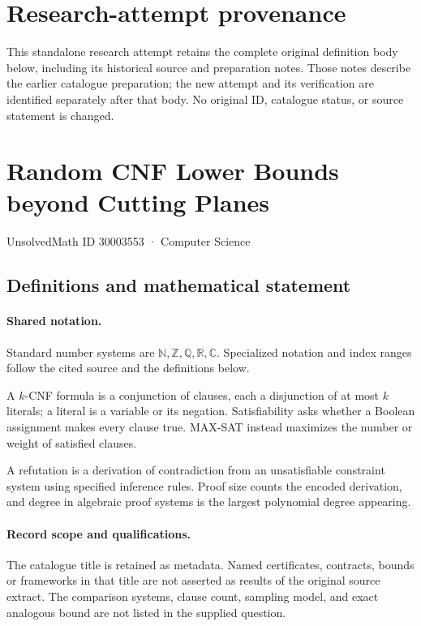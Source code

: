 \documentclass[11pt]{article}
\begin{document}
\section*{Research-attempt provenance}
This standalone research attempt retains the complete original definition body below,
including its historical source and preparation notes. Those notes describe the
earlier catalogue preparation; the new attempt and its verification are identified
separately after that body. No original ID, catalogue status, or source statement is changed.

\section{Random CNF Lower Bounds beyond Cutting Planes}\label{30003553}
{\small UnsolvedMath ID 30003553 · Computer Science}
\subsection{Definitions and mathematical statement}

\paragraph{Shared notation.}Standard number systems are $\mathbb N,\mathbb Z,\mathbb Q,\mathbb R,\mathbb C$. Specialized notation and index ranges follow the cited source and the definitions below.


A $k$-CNF formula is a conjunction of clauses, each a disjunction of at most $k$ literals; a literal is a variable or its negation. Satisfiability asks whether a Boolean assignment makes every clause true. MAX-SAT instead maximizes the number or weight of satisfied clauses.

A refutation is a derivation of contradiction from an unsatisfiable constraint system using specified inference rules. Proof size counts the encoded derivation, and degree in algebraic proof systems is the largest polynomial degree appearing.
\paragraph{Record scope and qualifications.}
The catalogue title is retained as metadata. Named certificates, contracts, bounds or frameworks in that title are not asserted as results of the original source extract.
The comparison systems, clause count, sampling model, and exact analogous bound are not listed in the supplied question.
\end{document}
